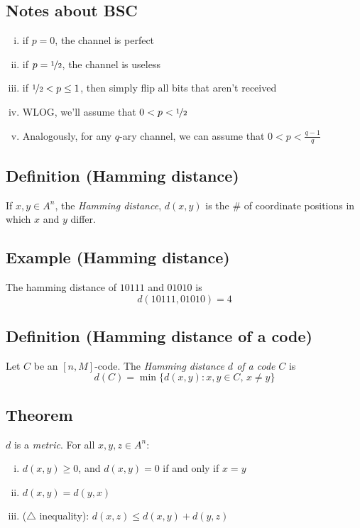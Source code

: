 \subsection{Notes about BSC}
\begin{enumerate}[(i)]
    \item if $ p=0 $, the channel is perfect
    \item if $ p=\nicefrac{1}{2} $, the channel is useless
    \item if $ \nicefrac{1}{2}<p\le 1 $, then simply flip all bits that aren't received
    \item WLOG, we'll assume that $ 0<p<\nicefrac{1}{2} $
    \item Analogously, for any $ q $-ary channel, we can assume that $ 0<p<\frac{q-1}{q} $
\end{enumerate}

\begin{defbox}
    \subsection{Definition (Hamming distance)}
    If $ x,y\in A^n $, the \emph{Hamming distance}, $ d(x,y) $ is
    the \# of coordinate positions in which $ x $ and $ y $ differ.
\end{defbox}

\begin{exbox}
    \subsection{Example (Hamming distance)}
    The hamming distance of $ 10111 $ and $ 01010 $ is 
    \[ d(10111,01010)=4 \]
\end{exbox}

\begin{defbox}
    \subsection{Definition (Hamming distance of a code)}
    Let $ C $ be an $ [n,M] $-code.
    The \emph{Hamming distance $ d $ of a code} $ C $ is
    \[ d(C)=\min \{d(x,y):x,y\in C,\,x\neq y\} \]
\end{defbox}

\begin{thmbox}
    \subsection{Theorem}
    $ d $ is a \emph{metric}. For all $ x,y,z\in A^n $:
    \begin{enumerate}[(i)]
        \item $ d(x,y)\ge 0 $, and $ d(x,y)=0 $ if and only if $ x=y $
        \item $ d(x,y)=d(y,x) $
        \item ($ \triangle $ inequality): $ d(x,z)\le d(x,y)+d(y,z) $
    \end{enumerate}
\end{thmbox}

